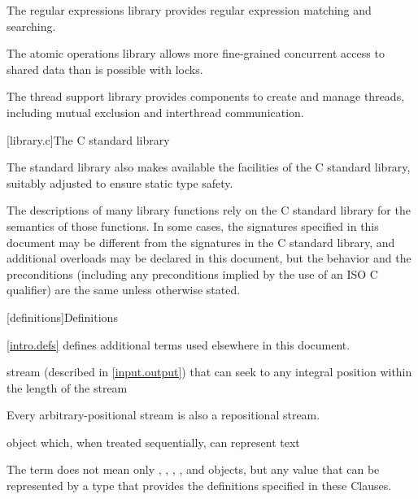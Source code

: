 \pnum
The regular expressions library provides regular expression matching and searching.

\pnum
The atomic operations library allows more fine-grained
concurrent access to shared data than is possible with locks.

\pnum
The thread support library provides components to create
and manage threads, including mutual exclusion and interthread communication.

[library.c]{The C standard library}

\pnum
The \Cpp{} standard library also makes available the facilities of the C standard library,
%
suitably adjusted to ensure static type safety.

\pnum
The descriptions of many library functions rely on the C standard library for
the semantics of those functions.
In some cases,
the signatures specified in this document
may be different from the signatures in the C standard library,
and additional overloads may be declared in this document,
but the behavior and the preconditions
(including any preconditions implied by the use of an
ISO C  qualifier)
are the same unless otherwise stated.

[definitions]{Definitions}

\pnum
\begin{note}
\ref{intro.defs} defines additional terms used elsewhere in this document.
\end{note}

%
stream (described in \ref{input.output}) that can seek to any integral position within
the length of the stream

\begin{defnote}
Every arbitrary-positional stream is also a repositional stream.
\end{defnote}

%
object which,
when treated sequentially,
can represent text

\begin{defnote}
The term does not mean only
,
,
,
,
and
objects,
but any value that can be represented by a type
that provides the definitions specified in these Clauses.
\end{defnote}

